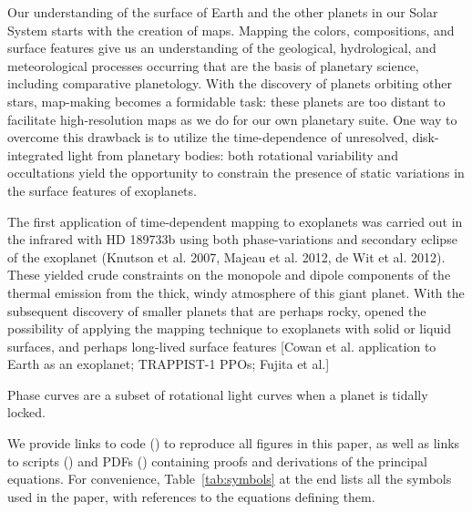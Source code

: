 \documentclass[modern]{aastex61}
\begin{document}
Our understanding of the surface of Earth and the other planets in our Solar
System starts with the creation of maps.  Mapping the colors, compositions, and
surface features give us an understanding of the geological, hydrological,
and meteorological processes occurring that are the basis of planetary science,
including comparative planetology.  With the discovery of planets orbiting other
stars, map-making becomes a formidable task:  these planets are too distant to
facilitate high-resolution maps as we do for our own planetary suite.  One way
to overcome this drawback is to utilize the time-dependence of unresolved,
disk-integrated light from planetary bodies:  both rotational variability and
occultations yield the opportunity to constrain the presence of static variations
in the surface features of exoplanets.

The first application of time-dependent mapping to exoplanets was carried out in the
infrared with HD 189733b using both phase-variations and secondary eclipse of the
exoplanet (Knutson et al. 2007, Majeau et al. 2012, de Wit et al. 2012).  These
yielded crude constraints on the monopole and dipole components of the thermal
emission from the thick, windy atmosphere of this giant planet.  With the subsequent
discovery of smaller planets that are perhaps rocky, opened the possibility of
applying the mapping technique to exoplanets with solid or liquid surfaces, and
perhaps long-lived surface features [Cowan et al. application to Earth as an exoplanet;
TRAPPIST-1 PPOs; Fujita et al.]

Phase curves are a subset of rotational light curves when a planet is tidally locked.


We provide links to \Python code (\pythonlogo{}) to reproduce all
figures in this paper, as well as links to \Mathematica scripts
(\mathematicalogo{}) and PDFs (\pdflogo{}) containing proofs and derivations
of the principal
equations. For convenience, Table~\ref{tab:symbols} at the end lists
all the symbols used
in the paper, with references to the equations defining them.

\end{document}
